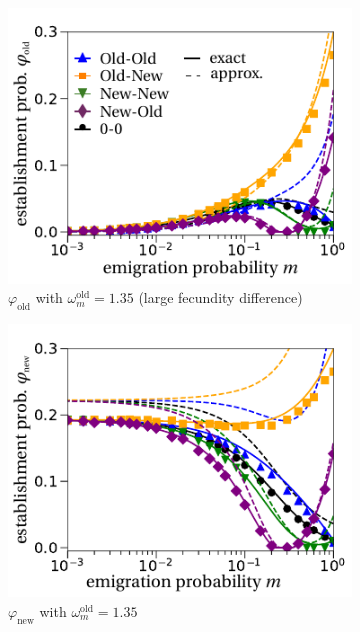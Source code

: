 \documentclass[11pt]{article}
\begin{document}
\begin{figure}[h]
	\centering
	\begin{subfigure}{.5\textwidth}
		\centering
		\includegraphics[width=\linewidth]{figS6a.pdf}
		\caption{$\varphi_{\text{old}}$ with $\omega^\text{old}_m=1.35$ (large fecundity difference)}
	\end{subfigure}%
	\begin{subfigure}{.5\textwidth}
		\centering
		\includegraphics[width=\linewidth]{figS6b.pdf}
		\caption{$\varphi_{\text{new}}$ with $\omega^\text{old}_m=1.35$}
	\end{subfigure}
	\begin{subfigure}{.5\textwidth}

\end{subfigure}
\end{figure}
\end{document}
